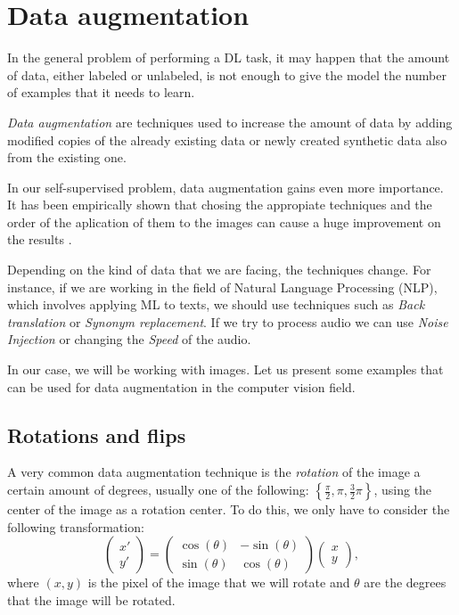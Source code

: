\section{Data augmentation}

In the general problem of performing a DL task, it may happen that the amount of data, either labeled or unlabeled, is not enough to give the model the number of examples that it needs to learn. 

\begin{ndef}
\emph{Data augmentation} are techniques used to increase the amount of data by adding modified copies of the already existing data or newly created synthetic data also from the existing one. 
\end{ndef}

In our self-supervised problem, data augmentation gains even more importance. It has been empirically shown that chosing the appropiate techniques and the order of the aplication of them to the images can cause a huge improvement on the results \citep{chen_simple_2020}.

Depending on the kind of data that we are facing, the techniques change. For instance, if we are working in the field of Natural Language Processing (NLP), which involves applying ML to texts, we should use techniques such as \emph{Back translation} or \emph{Synonym replacement}. If we try to process audio we can use \emph{Noise Injection} or changing the \emph{Speed} of the audio.

In our case, we will be working with images. Let us present some examples that can be used for data augmentation in the computer vision field.

\subsection*{Rotations and flips}

A very common data augmentation technique is the \emph{rotation} of the image a certain amount of degrees, usually one of the following: $\left\{\frac{\pi}{2}, \pi, \frac{3}{2}\pi\right\}$, using the center of the image as a rotation center. To do this, we only have to consider the following transformation:
\[
\begin{pmatrix} x' \\ y' \end{pmatrix} = \begin{pmatrix} \cos(\theta) & - \sin(\theta) \\ \sin(\theta) & \cos(\theta)\end{pmatrix} \begin{pmatrix} x \\ y\end{pmatrix}  ,  
\]
where $(x,y)$ is the pixel of the image that we will rotate and $\theta$ are the degrees that the image will be rotated.


